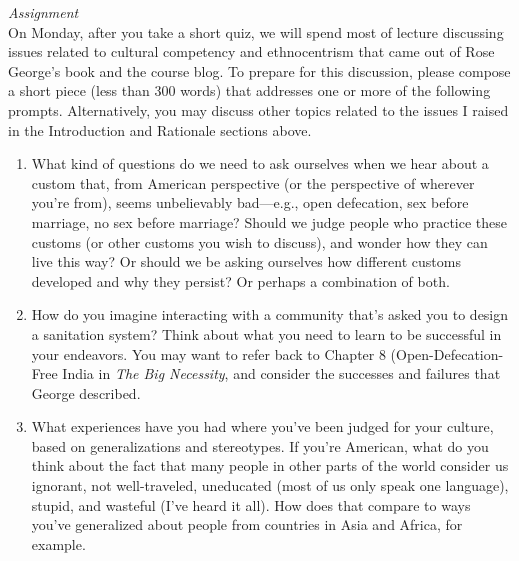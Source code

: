 \documentclass[12pt,letterpaper]{article}
\begin{document}
\begin{enumerate}
 



\emph{\large{Assignment}}\\
On Monday, after you take a short quiz, we will spend most of lecture discussing issues related to cultural competency and ethnocentrism that came out of Rose George's book and the course blog.  To prepare for this discussion, please compose a short piece (less than 300 words) that addresses one or more of the following prompts.  Alternatively, you may discuss other topics related to the issues I raised in the Introduction and Rationale sections above.

\begin{enumerate}
\item What kind of questions do we need to ask ourselves when we hear about a custom that, from American perspective (or the perspective of wherever you're from), seems unbelievably bad---e.g., open defecation, sex before marriage, no sex before marriage?  Should we judge people who practice these customs (or other customs you wish to discuss), and wonder how they can live this way? Or should we be asking ourselves how different customs developed and why they persist? Or perhaps a combination of both. 

\item How do you imagine interacting with a community that's asked you to design a sanitation system?  Think about what you need to learn to be successful in your endeavors.  You may want to refer back to Chapter 8 (Open-Defecation-Free India in \emph{The Big Necessity}, and consider the successes and failures that George described.

\item What experiences have you had where you've been judged for your culture, based on generalizations and stereotypes.  If you're American, what do you think about the fact that many people in other parts of the world consider us ignorant, not well-traveled, uneducated (most of us only speak one language), stupid, and wasteful (I've heard it all).  How does that compare to ways you've generalized about people from countries in Asia and Africa, for example. 
\end{enumerate}





\end{enumerate}
\end{document}
